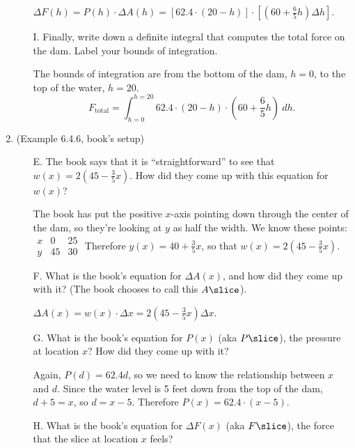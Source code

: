 \begin{enumerate}[leftmargin=0pt]
\begin{enumerate}
    \begin{red}
        $\Delta F(h) = P(h)\cdot\Delta A(h) = 
        \left[ 62.4\cdot(20-h) \right]\cdot\left[(60 + \tfrac65 h)\Delta h\right]$.
    \end{red}
    \item[I.] Finally, write down a definite integral that computes the total force on the dam. Label your bounds of integration.

    \begin{red}
    The bounds of integration are from the bottom of the dam, $h=0$, to the top of the water, $h=20$.
        \[F_\text{total} = \int_{h=0}^{h=20}62.4\cdot(20-h) \cdot \left(60 + \dfrac65 h\right)\ dh.\]
    \end{red}
\end{enumerate}
\vspace{-2em}
\item (Example 6.4.6, book's setup)
\begin{enumerate}
    \item[E.] The book says that it is ``straightforward'' to see that $w(x) = 2\left(45 - \tfrac35 x\right)$. How did they come up with this equation for $w(x)$?
    
    \begin{red}
        The book has put the positive $x$-axis pointing down through the center of the dam, so they're looking at $y$ as half the width. We know these points:
        $
\begin{array}{l||ll}
x & 0  & 25 \\\hline
y & 45 & 30
\end{array}
        $\quad
        Therefore $y(x) = 40 + \tfrac35 x$, so that $w(x) = 2\left(45 - \tfrac35 x\right)$. 
    \end{red}
    \item[F.] What is the book's equation for $\Delta A(x)$, and how did they come up with it? (The book chooses to call this $A\slice$).
    \begin{red}
        $\Delta A(x) = w(x)\cdot\Delta x =  2\left(45 - \tfrac35 x\right)\Delta x$. 
    \end{red}
    \item[G.] What is the book's equation for $P(x)$ (aka $P\slice$), the pressure at location $x$? How did they come up with it?

    \begin{red}
        Again, $P(d) = 62.4d$, so we need to know the relationship between $x$ and $d$. Since the water level is 5 feet down from the top of the dam, $d+5=x$, so $d = x-5$. Therefore $P(x) = 62.4\cdot(x-5)$.
    \end{red}
    \item[H.] What is the book's equation for $\Delta F(x)$ (aka $F\slice$), the force that the slice at location $x$ feels?
    

\end{enumerate}
\end{enumerate}
